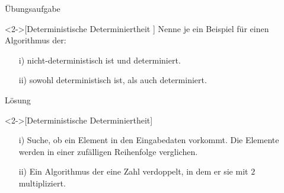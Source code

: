 \begin{frame}[c]{Übungsaufgabe}
    \begin{exercise}<2->[Deterministische Determiniertheit ]
        \pause{}Nenne je ein Beispiel für einen Algorithmus der:
        \begin{enumerate}[<+(1)->]
            \item[i)] nicht-deterministisch ist und determiniert.
            \item[ii)] sowohl deterministisch ist, als auch determiniert.
        \end{enumerate}
    \end{exercise}
\end{frame}

\begin{frame}[c]{Lösung}
    \begin{solve}<2->[Deterministische Determiniertheit]
        \pause{}\begin{enumerate}[<+(1)->]
            \item[i)] Suche, ob ein Element in den Eingabedaten vorkommt.\pause{} Die Elemente werden in einer zufälligen Reihenfolge verglichen.
            \item[ii)] Ein Algorithmus der eine Zahl verdoppelt, in dem er sie mit \(2\) multipliziert.
        \end{enumerate}
    \end{solve}
\end{frame}
\fi
